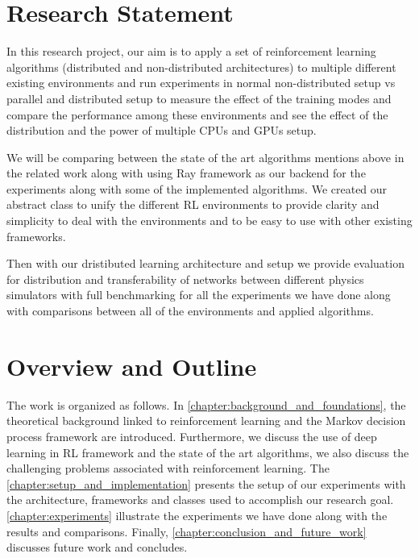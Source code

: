 \section{Research Statement}
In this research project, our aim is to apply a set of reinforcement learning algorithms (distributed and non-distributed architectures) to multiple different existing environments and run experiments in normal non-distributed setup vs parallel and distributed setup to measure the effect of the training modes and compare the performance among these environments and see the effect of the distribution and the power of multiple CPUs and GPUs setup. 

We will be comparing between the state of the art algorithms mentions above in the related work along with using Ray framework as our backend for the experiments along with some of the implemented algorithms. We created our abstract class to unify the different RL environments to provide clarity and simplicity to deal with the environments and to be easy to use with other existing frameworks.

Then with our dristibuted learning architecture and setup we provide evaluation for distribution and transferability of networks between different physics simulators with full benchmarking for all the experiments we have done along with comparisons between all of the environments and applied algorithms.

\section{Overview and Outline}
The work is organized as follows. In \autoref{chapter:background_and_foundations}, the theoretical background linked to reinforcement learning and the Markov decision process framework are introduced. Furthermore, we discuss the use of deep learning in RL framework and the state of the art algorithms, we also discuss the challenging problems associated with reinforcement learning.  The \autoref{chapter:setup_and_implementation} presents the setup of our experiments with the architecture, frameworks and classes used to accomplish our research goal. \autoref{chapter:experiments} illustrate the experiments we have done along with the results and comparisons. Finally, \autoref{chapter:conclusion_and_future_work} discusses future work and concludes.